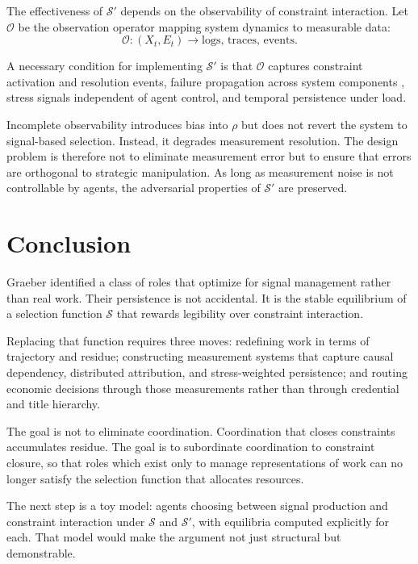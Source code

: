\documentclass[12pt]{article}
\begin{document}
The effectiveness of $\mathcal{S}'$ depends on the observability of
constraint interaction. Let $\mathcal{O}$ be the observation operator
mapping system dynamics to measurable data:
\[
  \mathcal{O} : (X_t, E_t) \rightarrow \text{logs, traces, events.}
\]

A necessary condition for implementing $\mathcal{S}'$ is that
$\mathcal{O}$ captures constraint activation and resolution events,
failure propagation across system components \cite{barabasi1999,newman2010},
stress signals independent of agent control, and temporal persistence
under load.

Incomplete observability introduces bias into $\rho$ but does not
revert the system to signal-based selection. Instead, it degrades
measurement resolution. The design problem is therefore not to eliminate
measurement error but to ensure that errors are orthogonal to strategic
manipulation. As long as measurement noise is not controllable by
agents, the adversarial properties of $\mathcal{S}'$ are preserved.

\section{Conclusion}

Graeber \cite{graeber2018} identified a class of roles that optimize for
signal management rather than real work. Their persistence is not accidental. It is the
stable equilibrium of a selection function $\mathcal{S}$ that rewards
legibility over constraint interaction.

Replacing that function requires three moves: redefining work in terms
of trajectory and residue; constructing measurement systems that capture
causal dependency, distributed attribution, and stress-weighted
persistence; and routing economic decisions through those measurements
rather than through credential and title hierarchy.

The goal is not to eliminate coordination. Coordination that closes
constraints accumulates residue. The goal is to subordinate coordination
to constraint closure, so that roles which exist only to manage
representations of work can no longer satisfy the selection function
that allocates resources.

\medskip
\noindent The next step is a toy model: agents choosing between signal
production and constraint interaction under $\mathcal{S}$ and
$\mathcal{S}'$, with equilibria computed explicitly for each. That model
would make the argument not just structural but demonstrable.
\end{document}
